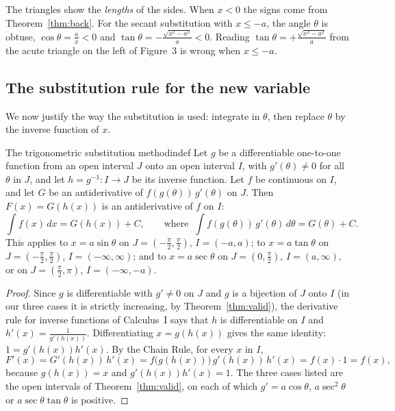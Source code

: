 \documentclass[11pt]{article}
\begin{document}
\begin{warn}
The triangles show the \emph{lengths} of the sides. When $x<0$ the signs come from Theorem~\ref{thm:back}. For the secant substitution with $x\le-a$, the angle $\theta$ is obtuse, $\cos\theta=\frac ax<0$ and $\tan\theta=-\frac{\sqrt{x^2-a^2}}a<0$. Reading $\tan\theta=+\frac{\sqrt{x^2-a^2}}a$ from the acute triangle on the left of Figure~3 is wrong when $x\le-a$.
\end{warn}

\subsection*{The substitution rule for the new variable}

We now justify the way the substitution is used: integrate in $\theta$, then replace $\theta$ by the inverse function of $x$.

\begin{thm}{The trigonometric substitution method}{indef}
Let $g$ be a differentiable one-to-one function from an open interval $J$ onto an open interval $I$, with $g'(\theta)\ne0$ for all $\theta$ in $J$, and let $h=g^{-1}:I\to J$ be its inverse function. Let $f$ be continuous on $I$, and let $G$ be an antiderivative of $f(g(\theta))\,g'(\theta)$ on $J$. Then $F(x)=G(h(x))$ is an antiderivative of $f$ on $I$:
\[\int f(x)\,dx=G(h(x))+C,\qquad\text{where }\ \int f(g(\theta))\,g'(\theta)\,d\theta=G(\theta)+C .\]
This applies to $x=a\sin\theta$ on $J=\left(-\frac\pi2,\frac\pi2\right)$, $I=(-a,a)$; to $x=a\tan\theta$ on $J=\left(-\frac\pi2,\frac\pi2\right)$, $I=(-\infty,\infty)$; and to $x=a\sec\theta$ on $J=\left(0,\frac\pi2\right)$, $I=(a,\infty)$, or on $J=\left(\frac\pi2,\pi\right)$, $I=(-\infty,-a)$.
\end{thm}
\begin{proof}
Since $g$ is differentiable with $g'\ne0$ on $J$ and $g$ is a bijection of $J$ onto $I$ (in our three cases it is strictly increasing, by Theorem~\ref{thm:valid}), the derivative rule for inverse functions of Calculus~I says that $h$ is differentiable on $I$ and $h'(x)=\frac1{g'(h(x))}$. Differentiating $x=g(h(x))$ gives the same identity: $1=g'(h(x))h'(x)$. By the Chain Rule, for every $x$ in $I$,
\[F'(x)=G'(h(x))\,h'(x)=f\big(g(h(x))\big)\,g'(h(x))\,h'(x)=f(x)\cdot1=f(x),\]
because $g(h(x))=x$ and $g'(h(x))h'(x)=1$. The three cases listed are the open intervals of Theorem~\ref{thm:valid}, on each of which $g'=a\cos\theta$, $a\sec^2\theta$ or $a\sec\theta\tan\theta$ is positive.
\end{proof}
\end{document}
